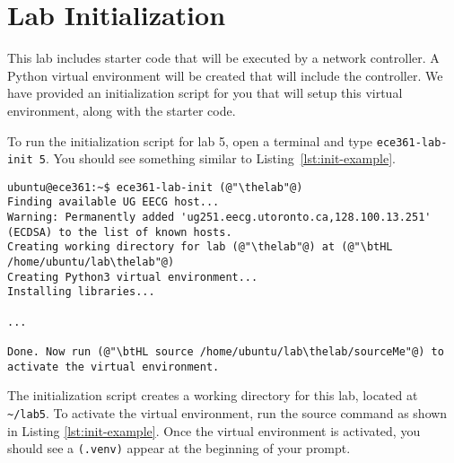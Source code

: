 \documentclass[11pt]{article}
\def\thelab{5}
\begin{document}
\section{Lab Initialization}
\label{sec:lab-init}

This lab includes starter code that will be executed by a network controller.
A Python virtual environment will be created that will include the controller.
We have provided an initialization script for you that will setup this virtual environment, along with the starter code.


To run the initialization script for lab \thelab, open a terminal and type \texttt{ece361-lab-init \thelab}.
You should see something similar to Listing~\ref{lst:init-example}.

\begin{lstlisting}[style=ece361shell, caption={Initializing lab \thelab.}, label={lst:init-example}]
ubuntu@ece361:~$ ece361-lab-init (@"\thelab"@)
Finding available UG EECG host...
Warning: Permanently added 'ug251.eecg.utoronto.ca,128.100.13.251' (ECDSA) to the list of known hosts.
Creating working directory for lab (@"\thelab"@) at (@"\btHL /home/ubuntu/lab\thelab"@)
Creating Python3 virtual environment...
Installing libraries...

...

Done. Now run (@"\btHL source /home/ubuntu/lab\thelab/sourceMe"@) to activate the virtual environment.
\end{lstlisting}

The initialization script creates a working directory for this lab, located at \texttt{\textasciitilde/lab\thelab}.
To activate the virtual environment, run the source command as shown in Listing \ref{lst:init-example}.
Once the virtual environment is activated, you should see a \texttt{(.venv)} appear at the beginning of your prompt.


\end{document}
